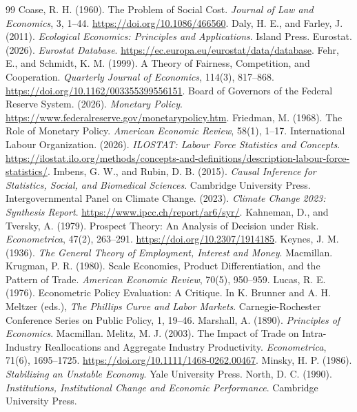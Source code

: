 \documentclass[11pt,oneside,openany]{book}
\begin{document}
\begin{thebibliography}{99}
 Coase, R. H. (1960). The Problem of Social Cost. \emph{Journal of Law and Economics}, 3, 1--44. \url{https://doi.org/10.1086/466560}.
 Daly, H. E., and Farley, J. (2011). \emph{Ecological Economics: Principles and Applications}. Island Press.
 Eurostat. (2026). \emph{Eurostat Database}. \url{https://ec.europa.eu/eurostat/data/database}.
 Fehr, E., and Schmidt, K. M. (1999). A Theory of Fairness, Competition, and Cooperation. \emph{Quarterly Journal of Economics}, 114(3), 817--868. \url{https://doi.org/10.1162/003355399556151}.
 Board of Governors of the Federal Reserve System. (2026). \emph{Monetary Policy}. \url{https://www.federalreserve.gov/monetarypolicy.htm}.
 Friedman, M. (1968). The Role of Monetary Policy. \emph{American Economic Review}, 58(1), 1--17.
 International Labour Organization. (2026). \emph{ILOSTAT: Labour Force Statistics and Concepts}. \url{https://ilostat.ilo.org/methods/concepts-and-definitions/description-labour-force-statistics/}.
 Imbens, G. W., and Rubin, D. B. (2015). \emph{Causal Inference for Statistics, Social, and Biomedical Sciences}. Cambridge University Press.
 Intergovernmental Panel on Climate Change. (2023). \emph{Climate Change 2023: Synthesis Report}. \url{https://www.ipcc.ch/report/ar6/syr/}.
 Kahneman, D., and Tversky, A. (1979). Prospect Theory: An Analysis of Decision under Risk. \emph{Econometrica}, 47(2), 263--291. \url{https://doi.org/10.2307/1914185}.
 Keynes, J. M. (1936). \emph{The General Theory of Employment, Interest and Money}. Macmillan.
 Krugman, P. R. (1980). Scale Economies, Product Differentiation, and the Pattern of Trade. \emph{American Economic Review}, 70(5), 950--959.
 Lucas, R. E. (1976). Econometric Policy Evaluation: A Critique. In K. Brunner and A. H. Meltzer (eds.), \emph{The Phillips Curve and Labor Markets}. Carnegie-Rochester Conference Series on Public Policy, 1, 19--46.
 Marshall, A. (1890). \emph{Principles of Economics}. Macmillan.
 Melitz, M. J. (2003). The Impact of Trade on Intra-Industry Reallocations and Aggregate Industry Productivity. \emph{Econometrica}, 71(6), 1695--1725. \url{https://doi.org/10.1111/1468-0262.00467}.
 Minsky, H. P. (1986). \emph{Stabilizing an Unstable Economy}. Yale University Press.
 North, D. C. (1990). \emph{Institutions, Institutional Change and Economic Performance}. Cambridge University Press.

\end{thebibliography}
\end{document}
